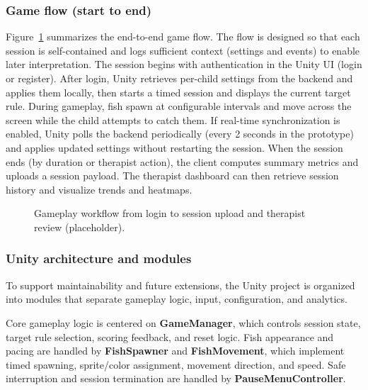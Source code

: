 \documentclass[12pt]{article}
\begin{document}
\subsubsection*{Game flow (start to end)}
Figure~\ref{fig:workflow} summarizes the end-to-end game flow. The flow is designed so that each session is self-contained and logs sufficient context (settings and events) to enable later interpretation.
The session begins with authentication in the Unity UI (login or register). After login, Unity retrieves per-child settings from the backend and applies them locally, then starts a timed session and displays the current target rule. During gameplay, fish spawn at configurable intervals and move across the screen while the child attempts to catch them. If real-time synchronization is enabled, Unity polls the backend periodically (every 2 seconds in the prototype) and applies updated settings without restarting the session. When the session ends (by duration or therapist action), the client computes summary metrics and uploads a session payload. The therapist dashboard can then retrieve session history and visualize trends and heatmaps.

\begin{figure}[H]
\centering
{}
\caption{Gameplay workflow from login to session upload and therapist review (placeholder).}
\label{fig:workflow}
\end{figure}

\subsubsection*{Unity architecture and modules}
To support maintainability and future extensions, the Unity project is organized into modules that separate gameplay logic, input, configuration, and analytics.

Core gameplay logic is centered on \textbf{GameManager}, which controls session state, target rule selection, scoring feedback, and reset logic. Fish appearance and pacing are handled by \textbf{FishSpawner} and \textbf{FishMovement}, which implement timed spawning, sprite/color assignment, movement direction, and speed. Safe interruption and session termination are handled by \textbf{PauseMenuController}.
\end{document}
